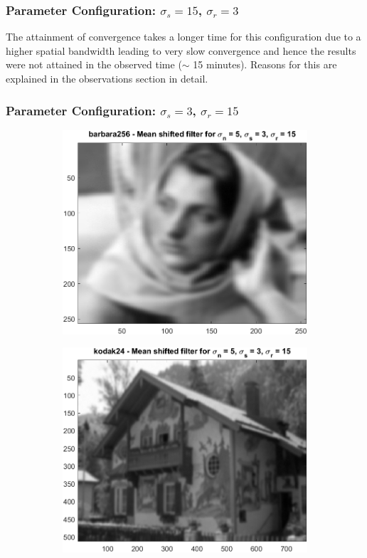 \documentclass{article}
\begin{document}
\subsubsection{Parameter Configuration: $\sigma_s = 15$, $\sigma_r = 3$}

The attainment of convergence takes a longer time for this configuration due to a higher spatial bandwidth leading to very slow convergence and hence the results were not attained in the observed time ($\sim$ 15 minutes). Reasons for this are explained in the observations section in detail.

\subsubsection{Parameter Configuration: $\sigma_s = 3$, $\sigma_r = 15$}
\begin{figure}[H]
    \centering
    \begin{subfigure}[b]{0.45\textwidth}
        \includegraphics[width=\textwidth]{../images/barbara_5_3_15.png}
    \end{subfigure}
    \begin{subfigure}[b]{0.45\textwidth}
        \includegraphics[width=\textwidth]{../images/kodak_5_3_15.png}

\end{subfigure}
\end{figure}
\end{document}
